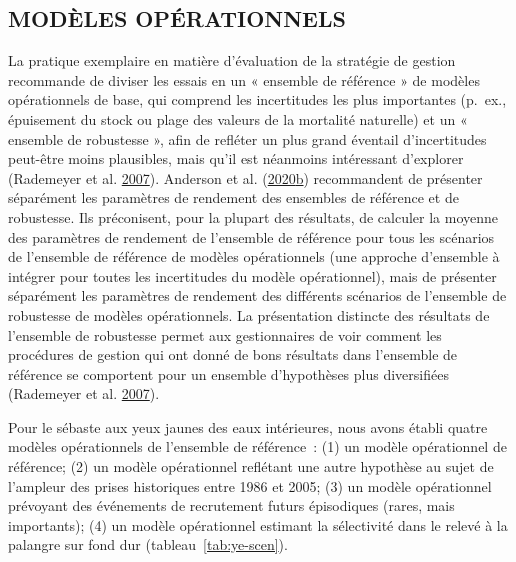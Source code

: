 \documentclass[11pt]{book}
\begin{document}
\hypertarget{sec:approach3-oms}{%
\subsection{MODÈLES OPÉRATIONNELS}\label{sec:approach3-oms}}

La pratique exemplaire en matière d'évaluation de la stratégie de gestion recommande de diviser les essais en un « ensemble de référence » de modèles opérationnels de base, qui comprend les incertitudes les plus importantes (p.~ex., épuisement du stock ou plage des valeurs de la mortalité naturelle) et un « ensemble de robustesse », afin de refléter un plus grand éventail d'incertitudes peut-être moins plausibles, mais qu'il est néanmoins intéressant d'explorer (Rademeyer et al. \protect\hyperlink{ref-rademeyer2007}{2007}). Anderson et al. (\protect\hyperlink{ref-anderson2020gfmp}{2020}\protect\hyperlink{ref-anderson2020gfmp}{b}) recommandent de présenter séparément les paramètres de rendement des ensembles de référence et de robustesse. Ils préconisent, pour la plupart des résultats, de calculer la moyenne des paramètres de rendement de l'ensemble de référence pour tous les scénarios de l'ensemble de référence de modèles opérationnels (une approche d'ensemble à intégrer pour toutes les incertitudes du modèle opérationnel), mais de présenter séparément les paramètres de rendement des différents scénarios de l'ensemble de robustesse de modèles opérationnels. La présentation distincte des résultats de l'ensemble de robustesse permet aux gestionnaires de voir comment les procédures de gestion qui ont donné de bons résultats dans l'ensemble de référence se comportent pour un ensemble d'hypothèses plus diversifiées (Rademeyer et al. \protect\hyperlink{ref-rademeyer2007}{2007}).

Pour le sébaste aux yeux jaunes des eaux intérieures, nous avons établi quatre modèles opérationnels de l'ensemble de référence~: (1) un modèle opérationnel de référence; (2) un modèle opérationnel reflétant une autre hypothèse au sujet de l'ampleur des prises historiques entre 1986 et 2005; (3) un modèle opérationnel prévoyant des événements de recrutement futurs épisodiques (rares, mais importants); (4) un modèle opérationnel estimant la sélectivité dans le relevé à la palangre sur fond dur (tableau~\ref{tab:ye-scen}).
\end{document}
